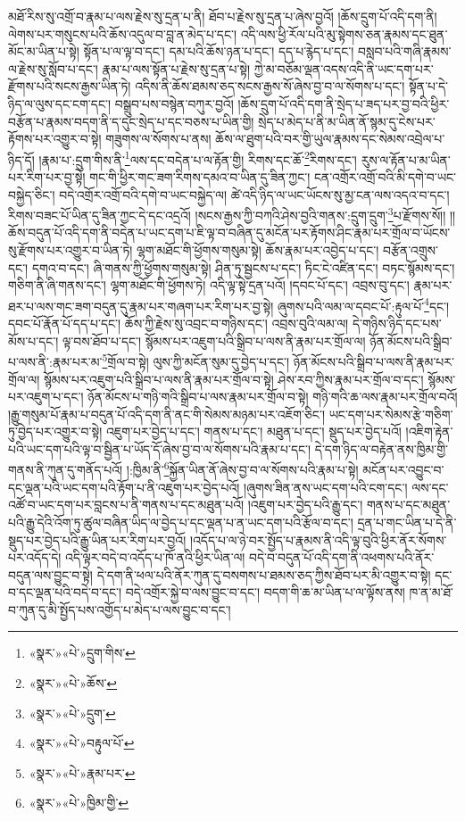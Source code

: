 མཐོ་རིས་སུ་འགྲོ་བ་རྣམ་པ་ལས་རྗེས་སུ་དྲན་པ་ནི། ཐོབ་པ་རྗེས་སུ་དྲན་པ་ཞེས་བྱའོ། །ཆོས་དྲུག་པོ་འདི་དག་ནི། ལེགས་པར་གསུངས་པའི་ཆོས་འདུལ་བ་བླ་ན་མེད་པ་དང་། འདི་ལས་ཕྱི་རོལ་པའི་མུ་སྟེགས་ཅན་རྣམས་དང་ཐུན་མོང་མ་ཡིན་པ་སྟེ། སྟོན་པ་ལ་ལྟ་བ་དང་། དམ་པའི་ཆོས་ཉན་པ་དང་། དད་པ་རྙེད་པ་དང་། བསླབ་པའི་གཞི་རྣམས་ལ་རྗེས་སུ་སློབ་པ་དང་། རྣམ་པ་ལས་སྟོན་པ་རྗེས་སུ་དྲན་པ་སྟེ། ཀྱེ་མ་བཅོམ་ལྡན་འདས་འདི་ནི་ཡང་དག་པར་རྫོགས་པའི་སངས་རྒྱས་ཡིན་ཏེ། འདིས་ནི་ཆོས་ཐམས་ཅད་སངས་རྒྱས་སོ་ཞེས་བྱ་བ་ལ་སོགས་པ་དང་། སྟོན་པ་དེ་ཉིད་ལ་ལུས་དང་ངག་དང་། བསྒྲུབ་པས་བསྙེན་བཀུར་བྱའོ། །ཆོས་དྲུག་པོ་འདི་དག་ནི་སྲེད་པ་ཟད་པར་བྱ་བའི་ཕྱིར་བརྩོན་པ་རྣམས་བདག་ནི་ད་དུང་སྲེད་པ་དང་བཅས་པ་ཡིན་གྱི། སྲེད་པ་མེད་པ་ནི་མ་ཡིན་ནོ་སྙམ་དུ་ངེས་པར་རྟོགས་པར་འགྱུར་བ་སྟེ། གཟུགས་ལ་སོགས་པ་ནས། ཆོས་ལ་ཐུག་པའི་བར་གྱི་ཡུལ་རྣམས་དང་སེམས་འབྲེལ་པ་ཉིད་དོ། །རྣམ་པ་:དྲུག་གིས་ནི་\footnote{«སྣར་»«པེ་»དྲུག་གིས་}ལས་དང་བདེན་པ་ལ་རྟོན་གྱི། རིགས་དང་ཆོ་\footnote{«སྣར་»«པེ་»ཆོས་}རིགས་དང་། རུས་ལ་རྟོན་པ་མ་ཡིན་པར་རིག་པར་བྱ་སྟེ། གང་གི་ཕྱིར་གང་ཟག་རིགས་དམའ་བ་ཡིན་དུ་ཟིན་ཀྱང་། ངན་འགྲོར་འགྲོ་བའི་མི་དགེ་བ་ཡང་བསྐྱེད་ཅིང་། བདེ་འགྲོར་འགྲོ་བའི་དགེ་བ་ཡང་བསྐྱེད་ལ། ཚེ་འདི་ཉིད་ལ་ཡང་ཡོངས་སུ་མྱ་ངན་ལས་འདའ་བ་དང་། རིགས་བཟང་པོ་ཡིན་དུ་ཟིན་ཀྱང་དེ་དང་འདྲའོ། །སངས་རྒྱས་ཀྱི་བཀའི་ཤེས་བྱའི་གནས་:དྲུག་དྲུག་\footnote{«སྣར་»«པེ་»དྲུག་}པ་རྫོགས་སོ།། །།ཆོས་བདུན་པོ་འདི་དག་ནི་བདེན་པ་ཡང་དག་པ་ཇི་ལྟ་བ་བཞིན་དུ་མངོན་པར་རྟོགས་ཤིང་རྣམ་པར་གྲོལ་བ་ཡོངས་སུ་རྫོགས་པར་འགྱུར་བ་ཡིན་ཏེ། ལྷག་མཐོང་གི་ཕྱོགས་གསུམ་སྟེ། ཆོས་རྣམ་པར་འབྱེད་པ་དང་། བརྩོན་འགྲུས་དང་། དགའ་བ་དང་། ཞི་གནས་ཀྱི་ཕྱོགས་གསུམ་སྟེ། ཤིན་ཏུ་སྦྱངས་པ་དང་། ཏིང་ངེ་འཛིན་དང་། བཏང་སྙོམས་དང་། གཅིག་ནི་ཞི་གནས་དང་། ལྷག་མཐོང་གི་ཕྱོགས་ཏེ། འདི་ལྟ་སྟེ་དྲན་པའོ། །དབང་པོ་དང་། འབྲས་བུ་དང་། རྣམ་པར་ཐར་པ་ལས་གང་ཟག་བདུན་དུ་རྣམ་པར་གཞག་པར་རིག་པར་བྱ་སྟེ། ཞུགས་པའི་ལམ་ལ་དབང་པོ་:རྟུལ་པོ་\footnote{«སྣར་»«པེ་»བརྟུལ་པོ་}དང་། དབང་པོ་རྣོན་པོ་དད་པ་དང་། ཆོས་ཀྱི་རྗེས་སུ་འབྲང་བ་གཉིས་དང་། འབྲས་བུའི་ལམ་ལ། དེ་གཉིས་ཉིད་དང་པས་མོས་པ་དང་། ལྟ་བས་ཐོབ་པ་དང་། སྙོམས་པར་འཇུག་པའི་སྒྲིབ་པ་ལས་ནི་རྣམ་པར་གྲོལ་ལ། ཉོན་མོངས་པའི་སྒྲིབ་པ་ལས་ནི་:རྣམ་པར་མ་\footnote{«སྣར་»«པེ་»རྣམ་པར་}གྲོལ་བ་སྟེ། ལུས་ཀྱི་མངོན་སུམ་དུ་བྱེད་པ་དང་། ཉོན་མོངས་པའི་སྒྲིབ་པ་ལས་ནི་རྣམ་པར་གྲོལ་ལ། སྙོམས་པར་འཇུག་པའི་སྒྲིབ་པ་ལས་ནི་རྣམ་པར་གྲོལ་བ་སྟེ། ཤེས་རབ་ཀྱིས་རྣམ་པར་གྲོལ་བ་དང་། སྙོམས་པར་འཇུག་པ་དང་། ཉོན་མོངས་པ་གཉི་གའི་སྒྲིབ་པ་ལས་རྣམ་པར་གྲོལ་བ་སྟེ། གཉི་གའི་ཆ་ལས་རྣམ་པར་གྲོལ་བའོ། །རྒྱུ་གསུམ་པོ་རྣམ་པ་བདུན་པོ་འདི་དག་ནི་ནང་གི་སེམས་མཉམ་པར་འཇོག་ཅིང་། ཡང་དག་པར་སེམས་རྩེ་གཅིག་ཏུ་བྱེད་པར་འགྱུར་བ་སྟེ། འཇུག་པར་བྱེད་པ་དང་། གནས་པ་དང་། མཐུན་པ་དང་། སྡུད་པར་བྱེད་པའོ། །འཇིག་རྟེན་པའི་ཡང་དག་པའི་ལྟ་བ་སྦྱིན་པ་ཡོད་དོ་ཞེས་བྱ་བ་ལ་སོགས་པའི་རྣམ་པ་དང་། དེ་དག་ཉིད་ལ་བརྟེན་ནས་ཁྱིམ་གྱི་གནས་ནི་ཀུན་དུ་གནོད་པའོ། །:ཁྱིམ་ནི་\footnote{«སྣར་»«པེ་»ཁྱིམ་གྱི་}སྐྱོན་ཡིན་ནོ་ཞེས་བྱ་བ་ལ་སོགས་པའི་རྣམ་པ་སྟེ། མངོན་པར་འབྱུང་བ་དང་ལྡན་པའི་ཡང་དག་པའི་རྟོག་པ་ནི་འཇུག་པར་བྱེད་པའོ། །ཞུགས་ཟིན་ནས་ཡང་དག་པའི་ངག་དང་། ལས་དང་འཚོ་བ་ཡང་དག་པར་བླངས་པ་ནི་གནས་པ་དང་མཐུན་པའོ། །འཇུག་པར་བྱེད་པའི་རྒྱུ་དང་། གནས་པ་དང་མཐུན་པའི་རྒྱུ་དེའི་འོག་ཏུ་ཚུལ་བཞིན་ཡིད་ལ་བྱེད་པ་དང་ལྡན་པ་ན་ཡང་དག་པའི་རྩོལ་བ་དང་། དྲན་པ་གང་ཡིན་པ་དེ་ནི་སྡུད་པར་བྱེད་པའི་རྒྱུ་ཡིན་པར་རིག་པར་བྱའོ། །འདོད་པ་ལ་ཉེ་བར་སྤྱོད་པ་རྣམས་ནི་འདི་ལྟ་བུའི་ཕྱིར་ནོར་སོགས་པར་འདོད་དེ། འདི་ལྟར་བདེ་བ་འདོད་པ་ཁོ་ནའི་ཕྱིར་ཡིན་ལ། བདེ་བ་བདུན་པོ་འདི་དག་ནི་འཕགས་པའི་ནོར་བདུན་ལས་བྱུང་བ་སྟེ། དེ་དག་ནི་ཕལ་པའི་ནོར་ཀུན་དུ་བསགས་པ་ཐམས་ཅད་ཀྱིས་ཐོབ་པར་མི་འགྱུར་བ་སྟེ། དང་བ་དང་ལྡན་པའི་བདེ་བ་དང་། བདེ་འགྲོར་སྐྱེ་བ་ལས་བྱུང་བ་དང་། བདག་གི་ཆ་མ་ཡིན་པ་ལ་ལྟོས་ནས། ཁ་ན་མ་ཐོ་བ་ཀུན་དུ་མི་སྤྱོད་པས་འགྱོད་པ་མེད་པ་ལས་བྱུང་བ་དང་། 